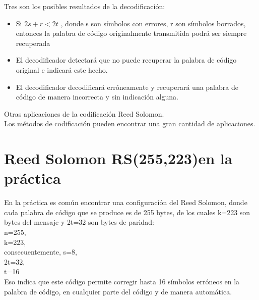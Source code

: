  Tres son los posibles resultados de la decodificación:
 \begin{itemize}
 \item  Si $2s + r < 2t$ , donde s son símbolos con errores, r son símbolos borrados, entonces la palabra de código originalmente transmitida podrá ser siempre recuperada
 \item El decodificador detectará que no puede recuperar la palabra de código original e indicará  este hecho.
 \item El decodificador decodificará erróneamente y recuperará una palabra de código de manera incorrecta y sin indicación alguna.
 \end{itemize}
 
 Otras aplicaciones de la codificación Reed Solomon. \\

Los métodos de codificación pueden encontrar una gran cantidad de aplicaciones. 

\begin{table}[h!]
	\centering
\end{table}

\section{Reed Solomon RS(255,223)en la práctica}

En la práctica es común encontrar una configuración del Reed Solomon, donde cada  palabra de código que se produce es de 255 bytes, de los cuales k=223 son bytes del mensaje y 2t=32 son bytes de paridad: \\
n=255, \\
k=223, \\
consecuentemente, s=8, \\
2t=32, \\
t=16 \\
Eso indica que este código permite corregir  hasta 16 símbolos erróneos en la palabra de código, en cualquier parte del código y de manera automática. \\

